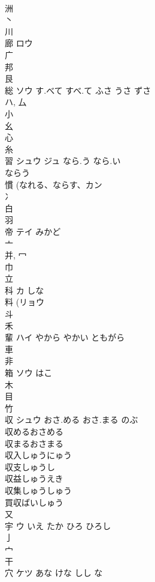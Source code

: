 \documentclass[8pt]{extreport}
\begin{document}
\begin{CJK}{UTF8}{min}
\\	洲 
\\	丶 
\\	川 
\\	廊	ロウ		
\\	广 
\\	邦 
\\	艮 
\\	総	ソウ	す.べて すべ.て ふさ うさ ずさ	
\\	ハ, 厶 
\\	小 
\\	幺 
\\	心 
\\	糸 
\\	習	シュウ ジュ	なら.う なら.い	
\\	ならう 
\\	慣 (なれる、ならす、カン 
\\	冫 
\\	白 
\\	羽 
\\	帝	テイ	みかど	
\\	亠 
\\	并, 冖 
\\	巾 
\\	立 
\\	科	カ	しな	
\\	料 (リョウ 
\\	斗 
\\	禾 
\\	輩	ハイ	やから やかい ともがら	
\\	車 
\\	非 
\\	箱	ソウ	はこ	
\\	木 
\\	目 
\\	竹 
\\	収	シュウ	おさ.める おさ.まる のぶ	
\\	収めるおさめる
\\	収まるおさまる
\\	収入しゅうにゅう
\\	収支しゅうし
\\	収益しゅうえき
\\	収集しゅうしゅう
\\	買収ばいしゅう
\\	又 
\\	宇	ウ	いえ たか ひろ ひろし	
\\	亅 
\\	宀 
\\	干 
\\	穴	ケツ	あな けな しし な	

\end{CJK}
\end{document}
